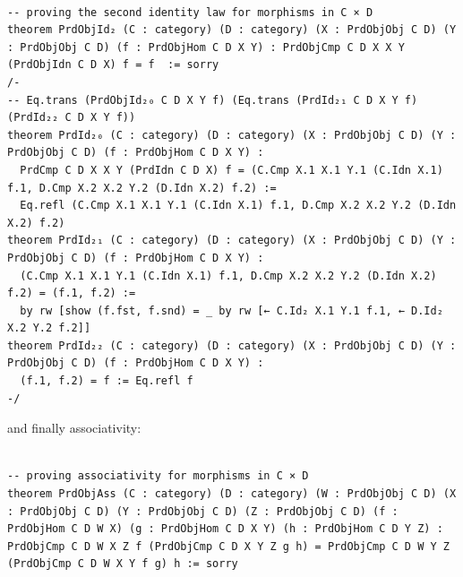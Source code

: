 \documentclass{book}
\newcounter{lcounter}
\begin{document}
\begin{center}
\begin{tcolorbox}[width=5in,colback={white},title={\begin{center}\texttt{Lean \thelcounter} \addtocounter{lcounter}{1}  \end{center}},colbacktitle=Blue,coltitle=black]
\begin{verbatim}

-- proving the second identity law for morphisms in C × D 
theorem PrdObjId₂ (C : category) (D : category) (X : PrdObjObj C D) (Y : PrdObjObj C D) (f : PrdObjHom C D X Y) : PrdObjCmp C D X X Y (PrdObjIdn C D X) f = f  := sorry
/-
-- Eq.trans (PrdObjId₂₀ C D X Y f) (Eq.trans (PrdId₂₁ C D X Y f) (PrdId₂₂ C D X Y f))
theorem PrdId₂₀ (C : category) (D : category) (X : PrdObjObj C D) (Y : PrdObjObj C D) (f : PrdObjHom C D X Y) :
  PrdCmp C D X X Y (PrdIdn C D X) f = (C.Cmp X.1 X.1 Y.1 (C.Idn X.1) f.1, D.Cmp X.2 X.2 Y.2 (D.Idn X.2) f.2) := 
  Eq.refl (C.Cmp X.1 X.1 Y.1 (C.Idn X.1) f.1, D.Cmp X.2 X.2 Y.2 (D.Idn X.2) f.2)
theorem PrdId₂₁ (C : category) (D : category) (X : PrdObjObj C D) (Y : PrdObjObj C D) (f : PrdObjHom C D X Y) :
  (C.Cmp X.1 X.1 Y.1 (C.Idn X.1) f.1, D.Cmp X.2 X.2 Y.2 (D.Idn X.2) f.2) = (f.1, f.2) :=
  by rw [show (f.fst, f.snd) = _ by rw [← C.Id₂ X.1 Y.1 f.1, ← D.Id₂ X.2 Y.2 f.2]]
theorem PrdId₂₂ (C : category) (D : category) (X : PrdObjObj C D) (Y : PrdObjObj C D) (f : PrdObjHom C D X Y) :
  (f.1, f.2) = f := Eq.refl f
-/

\end{verbatim}%
\end{tcolorbox}
\end{center}

and finally associativity:

\begin{center}
\begin{tcolorbox}[width=5in,colback={white},title={\begin{center}\texttt{Lean \thelcounter} \addtocounter{lcounter}{1}  \end{center}},colbacktitle=Blue,coltitle=black]
\begin{verbatim}

-- proving associativity for morphisms in C × D
theorem PrdObjAss (C : category) (D : category) (W : PrdObjObj C D) (X : PrdObjObj C D) (Y : PrdObjObj C D) (Z : PrdObjObj C D) (f : PrdObjHom C D W X) (g : PrdObjHom C D X Y) (h : PrdObjHom C D Y Z) : PrdObjCmp C D W X Z f (PrdObjCmp C D X Y Z g h) = PrdObjCmp C D W Y Z (PrdObjCmp C D W X Y f g) h := sorry

\end{verbatim}%
\end{tcolorbox}
\end{center}
\end{document}

